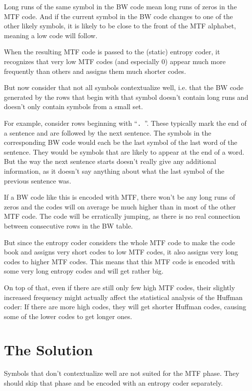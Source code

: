 \documentclass[a4paper]{scrreprt}
\begin{document}
Long runs of the same symbol in the BW code mean long runs of zeros in the MTF
code. And if the current symbol in the BW code changes to one of the other
likely symbols, it is likely to be close to the front of the MTF alphabet,
meaning a low code will follow.

When the resulting MTF code is passed to the (static) entropy coder, it
recognizes that very low MTF codes (and especially 0) appear much more
frequently than others and assigns them much shorter codes.

But now consider that not all symbols contextualize well, i.e. that the BW code
generated by the rows that begin with that symbol doesn't contain long runs and
doesn't only contain symbols from a small set.

For example, consider rows beginning with ``\texttt{. }''. These typically mark
the end of a sentence and are followed by the next sentence. The symbols in the
corresponding BW code would each be the last symbol of the last word of the
sentence. They would be symbols that are likely to appear at the end of a
word. But the way the next sentence starts doesn't really give any additional
information, as it doesn't say anything about what the last symbol of the
previous sentence was.

If a BW code like this is encoded with MTF, there won't be any long runs of
zeros and the codes will on average be much higher than in most of the other MTF
code. The code will be erratically jumping, as there is no real connection
between consecutive rows in the BW table.

But since the entropy coder considers the whole MTF code to make the code
book and assigns very short codes to low MTF codes, it also assigns very long
codes to higher MTF codes. This means that this MTF code is encoded with some
very long entropy codes and will get rather big.

On top of that, even if there are still only few high MTF codes, their slightly
increased frequency might actually affect the statistical analysis of the
Huffman coder: If there are more high codes, they will get shorter Huffman
codes, causing some of the lower codes to get longer ones.

\section{The Solution}

Symbols that don't contextualize well are not suited for the MTF phase. They
should skip that phase and be encoded with an entropy coder separately.
\end{document}
